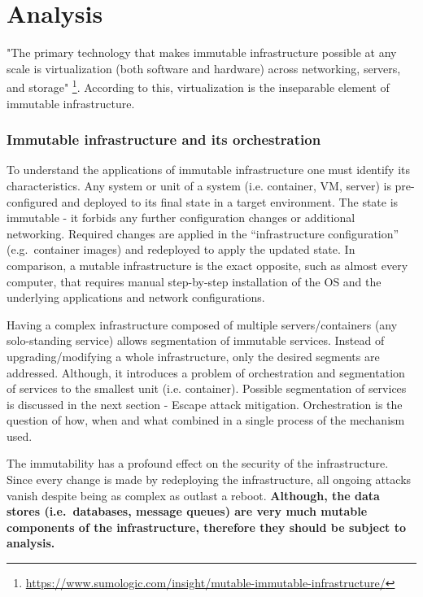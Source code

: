 \documentclass[12pt,a4paper,twoside]{report}
\begin{document}
\chapter{Analysis}\label{analysis}

"The primary technology that makes immutable infrastructure possible at
any scale is virtualization (both software and hardware) across
networking, servers, and storage"
\footnote{\url{https://www.sumologic.com/insight/mutable-immutable-infrastructure/}}.
According to this, virtualization is the inseparable element of
immutable infrastructure.

\subsection{Immutable infrastructure and its orchestration}\label{immutable-infrastructure-and-its-orchestration}

To understand the applications of immutable infrastructure one must
identify its characteristics. Any system or unit of a system
(i.e. container, VM, server) is pre-configured and deployed to its final
state in a target environment. The state is immutable - it forbids any
further configuration changes or additional networking. Required changes
are applied in the ``infrastructure configuration'' (e.g.~container
images) and redeployed to apply the updated state. In comparison, a
mutable infrastructure is the exact opposite, such as almost every
computer, that requires manual step-by-step installation of the OS and
the underlying applications and network configurations.

Having a complex infrastructure composed of multiple servers/containers
(any solo-standing service) allows segmentation of immutable services.
Instead of upgrading/modifying a whole infrastructure, only the desired
segments are addressed. Although, it introduces a problem of
orchestration and segmentation of services to the smallest unit
(i.e. container). Possible segmentation of services is discussed in the
next section - Escape attack mitigation. Orchestration is the question
of how, when and what combined in a single process of the mechanism
used.

The immutability has a profound effect on the security of the
infrastructure. Since every change is made by redeploying the
infrastructure, all ongoing attacks vanish despite being as complex as
outlast a reboot. \textbf{Although, the data stores (i.e.~databases,
message queues) are very much mutable components of the infrastructure,
therefore they should be subject to analysis.}
\end{document}
